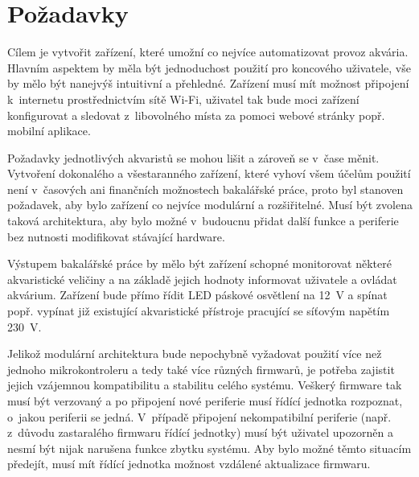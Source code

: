 \section{Požadavky}
\label{sec:pozadavky}
    Cílem je vytvořit zařízení, které umožní co nejvíce automatizovat provoz akvária. Hlavním aspektem by měla být jednoduchost použití pro koncového uživatele, vše by mělo být nanejvýš intuitivní a přehledné. Zařízení musí mít možnost připojení k~internetu prostřednictvím sítě Wi-Fi, uživatel tak bude moci zařízení konfigurovat a sledovat z~libovolného místa za pomoci webové stránky popř. mobilní aplikace.

    Požadavky jednotlivých akvaristů se mohou lišit a zároveň se v~čase měnit. Vytvoření dokonalého a všestaranného zařízení, které vyhoví všem účelům použití není v~časových ani finančních možnostech bakalářské práce, proto byl stanoven požadavek, aby bylo zařízení co nejvíce modulární a rozšiřitelné. Musí být zvolena taková architektura, aby bylo možné v~budoucnu přidat další funkce a periferie bez nutnosti modifikovat stávající hardware.

    Výstupem bakalářské práce by mělo být zařízení schopné monitorovat některé akvaristické veličiny a na základě jejich hodnoty informovat uživatele a ovládat akvárium. Zařízení bude přímo řídit LED páskové osvětlení na \qty{12}{V} a spínat popř. vypínat již existující akvaristické přístroje pracující se síťovým napětím \qty{230}{V}.  

    Jelikož modulární architektura bude nepochybně vyžadovat použití více než jednoho mikrokontroleru a tedy také více různých firmwarů, je potřeba zajistit jejich vzájemnou kompatibilitu a stabilitu celého systému. Veškerý firmware tak musí být verzovaný a po připojení nové periferie musí řídící jednotka rozpoznat, o~jakou periferii se jedná. V~případě připojení nekompatibilní periferie (např. z~důvodu zastaralého firmwaru řídící jednotky) musí být uživatel upozorněn a nesmí být nijak narušena funkce zbytku systému. Aby bylo možné těmto situacím předejít, musí mít řídící jednotka možnost vzdálené aktualizace firmwaru.